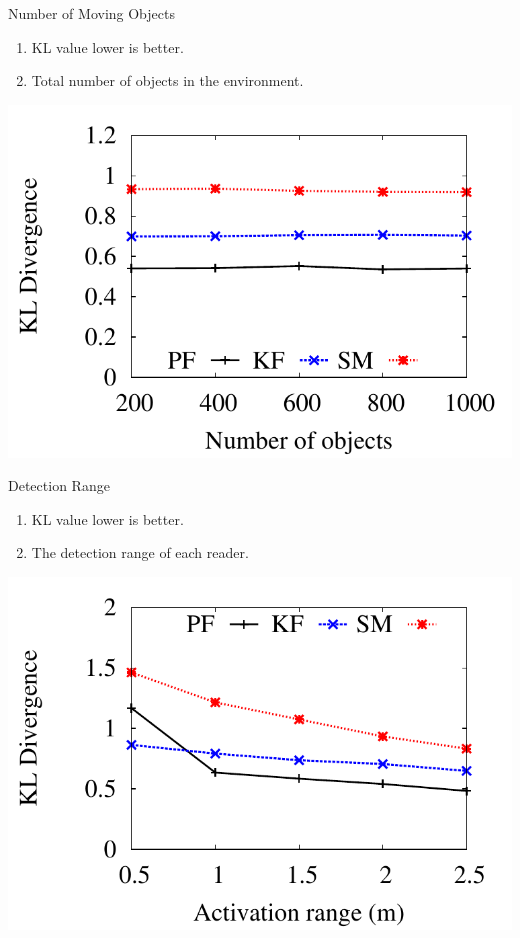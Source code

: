 \documentclass[xcolor={usenames,dvipsnames}]{beamer}
\begin{document}
\begin{frame}[label={sec:org674a560}]{Number of Moving Objects}
\begin{enumerate}
\item KL value lower is better.
\item Total number of objects in the environment.
\end{enumerate}

\begin{center}
\includegraphics[width=.7\textwidth]{img/kl-n.pdf}
\end{center}
\end{frame}

\begin{frame}[label={sec:org7cfd852}]{Detection Range}
\begin{enumerate}
\item KL value lower is better.
\item The detection range of each reader.
\end{enumerate}

\begin{center}
\includegraphics[width=.7\textwidth]{img/kl-r.pdf}
\end{center}
\end{frame}
\end{document}
